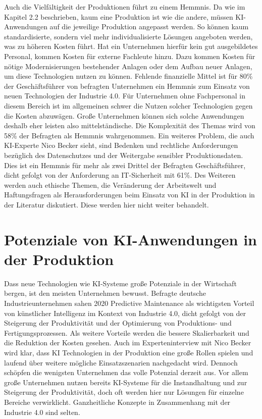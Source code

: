 \documentclass[a4paper,12pt, german]{report}
\begin{document}
Auch die Vielfältigkeit der Produktionen führt zu einem Hemmnis. Da wie im Kapitel 2.2 beschrieben, kaum eine Produktion ist wie die andere, müssen KI-Anwendungen auf die jeweilige Produktion angepasst werden. So können kaum standardisierte, sondern viel mehr individualisierte Lösungen angeboten werden, was zu höheren Kosten führt. Hat ein Unternehmen hierfür kein gut ausgebildetes Personal, kommen Kosten für externe Fachleute hinzu. Dazu kommen Kosten für nötige Modernisierungen bestehender Anlagen oder dem Aufbau neuer Anlagen, um diese Technologien nutzen zu können. Fehlende finanzielle Mittel ist für 80\% der Geschäftsführer von befragten Unternehmen ein Hemmnis zum Einsatz von neuen Technologien der Industrie 4.0. Für Unternehmen ohne Fachpersonal in diesem Bereich ist im allgemeinen schwer die Nutzen solcher Technologien gegen die Kosten abzuwägen. Große Unternehmen können sich solche Anwendungen deshalb eher leisten also mittelständische. Die Komplexität des Themas wird von 58\% der Befragten als Hemmnis wahrgenommen. Ein weiteres Problem, die auch KI-Experte Nico Becker sieht, sind Bedenken und rechtliche Anforderungen bezüglich des Datenschutzes und der Weitergabe sensibler Produktionsdaten. Dies ist ein Hemmnis für mehr als zwei Drittel der Befragten Geschäftsführer, dicht gefolgt von der Anforderung an IT-Sicherheit mit 61\%.\cite{35} Des Weiteren werden auch ethische Themen, die Veränderung der Arbeitswelt und Haftungsfragen als Herausforderungen beim Einsatz von KI in der Produktion in der Literatur diskutiert. Diese werden hier nicht weiter behandelt.


\section{Potenziale von KI-Anwendungen in der Produktion}

Dass neue Technologien wie KI-Systeme große Potenziale in der Wirtschaft bergen, ist den meisten Unternehmen bewusst. Befragte deutsche Industrieunternehmen sahen 2020 Predictive Maintenance als wichtigsten Vorteil von künstlicher Intelligenz im Kontext von Industrie 4.0, dicht gefolgt von der Steigerung der Produktivität und der Optimierung von Produktions- und Fertigungsprozessen. Als weitere Vorteile werden die bessere Skalierbarkeit und die Reduktion der Kosten gesehen.\cite{28} Auch im Experteninterview mit Nico Becker wird klar, dass KI Technologien in der Produktion eine große Rollen spielen und laufend über weitere mögliche Einsatzszenarien nachgedacht wird. Dennoch schöpfen die wenigsten Unternehmen das volle Potenzial derzeit aus. Vor allem große Unternehmen nutzen bereits KI-Systeme für die Instandhaltung und zur Steigerung der Produktivität, doch oft werden hier nur Lösungen für einzelne Bereiche verwirklicht. Ganzheitliche Konzepte in Zusammenhang mit der Industrie 4.0 sind selten.\cite{02}
\end{document}
